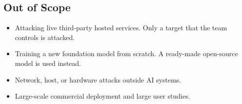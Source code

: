 \subsection{Out of Scope}
\begin{itemize}
  \item Attacking live third-party hosted services. Only a target that the team
  controls is attacked.
  \item Training a new foundation model from scratch. A ready-made open-source
  model is used instead.
  \item Network, host, or hardware attacks outside AI systems.
  \item Large-scale commercial deployment and large user studies.
\end{itemize}
